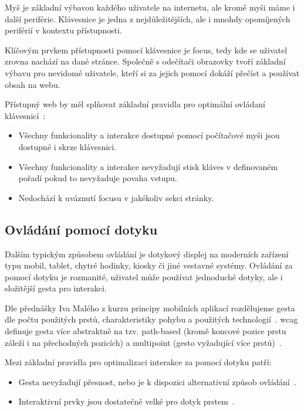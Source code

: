 Myš je základní výbavou každého uživatele na internetu, ale kromě myši máme i další periférie.
Klávesnice je jedna z nejdůležitějších, ale i mnohdy opomíjených periférií v kontextu přístupnosti.


Klíčovým prvkem přístupnosti pomocí klávesnice je focus, tedy kde se uživatel zrovna nachází na dané stránce.
Společně s odečítači obrazovky tvoří základní výbavu pro nevidomé uživatele, kteří si za jejich pomocí dokáží přečíst a používat obsah na webu.

Přístupný web by měl splňovat základní pravidla pro optimální ovládaní klávesnicí~\cite{wcag-keyboard}:

\begin{itemize}
  \item Všechny funkcionality a interakce dostupné pomocí počítačové myši jsou dostupné i skrze klávesnici.
  \item Všechny funkcionality a interakce nevyžadují stisk kláves v definovaném pořadí pokud to nevyžaduje povaha vstupu.
  \item Nedochází k uváznutí focusu v jakékoliv sekci stránky.
\end{itemize}

\subsection{Ovládání pomocí dotyku}

Dalším typickým způsobem ovládání je dotykový displej na moderních zařízení typu mobil, tablet, chytré hodinky, kiosky či jiné vestavné systémy.
Ovládání za pomocí dotyku je rozmanité, uživatel může používat jednoduché dotyky, ale i složitější gesta pro interakci.


Dle přednášky Iva Malého z kurzu principy mobilních aplikací rozdělujeme gesta dle počtu použitých prstů, charakteristiky pohybu a použitých technologií~\cite{ctu-pda-11}.
\gls{wcag} definuje gesta více abstraktně na tzv. path-based (kromě koncové pozice prstu záleží i na přechodných pozicích) a multipoint (gesto vyžadující více prstů)~\cite{wcag-pointer-gestures}.

Mezi základní pravidla pro optimalizaci interakce za pomocí dotyku patří:

\begin{itemize}
  \item Gesta nevyžadují přesnost, nebo je k dispozici alternativní způsob ovládání~\cite{wcag-pointer-gestures}.
  \item Interaktivní prvky jsou dostatečně velké pro dotyk prstem~\cite{wcag-target-size}.
\end{itemize}

